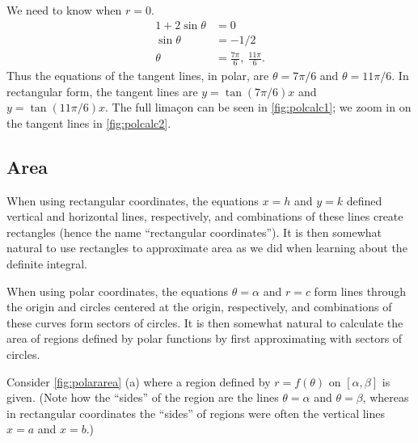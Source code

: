 {We need to know when $r=0$. 
\begin{align*}
1+2\sin\theta &= 0\\
\sin\theta &= -1/2\\
\theta &= \frac{7\pi}{6},\ \frac{11\pi}6.
\end{align*}
Thus the equations of the tangent lines, in polar, are $\theta = 7\pi/6$ and $\theta = 11\pi/6$. In rectangular form, the tangent lines are $y=\tan(7\pi/6)x$ and $y=\tan(11\pi/6)x$. The full lima\c con can be seen in \autoref{fig:polcalc1}; we zoom in on the tangent lines in \autoref{fig:polcalc2}.}

\subsection*{Area}

When using rectangular coordinates, the equations $x=h$ and $y=k$ defined vertical and horizontal lines, respectively, and combinations of these lines create rectangles (hence the name ``rectangular coordinates''). It is then somewhat natural to use rectangles to approximate area as we did when learning about the definite integral.


When using polar coordinates, the equations $\theta=\alpha$ and $r=c$ form lines through the origin and circles centered at the origin, respectively, and combinations of these curves form sectors of circles. It is then somewhat natural to calculate the area of regions defined by polar functions by first approximating with sectors of circles. 

Consider \autoref{fig:polararea} (a) where a region defined by $r=f(\theta)$ on $[\alpha,\beta]$ is given. (Note how the ``sides'' of the region are the lines $\theta=\alpha$ and $\theta=\beta$, whereas in rectangular coordinates the ``sides'' of regions were often the vertical lines $x=a$ and $x=b$.)

